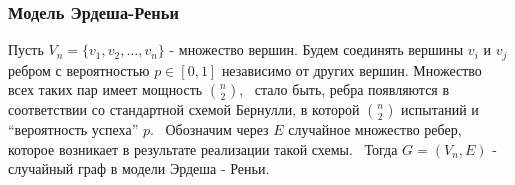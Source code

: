 \frametitle{Модель Эрдеша-Реньи} 


\begin{rdefinition}    
    Пусть $V_n = \{v_1, v_2, \dots, v_n\}$ - множество вершин. 
    Будем соединять вершины $v_i$ и $v_j$ ребром с вероятностью $p \in [0, 1]$ независимо от других вершин.  
    Множество всех таких пар имеет мощность $\binom{n}{2}$, \
    стало быть, ребра появляются в соответствии со стандартной схемой Бернулли, в которой  $\binom{n}{2}$ испытаний и “вероятность успеха” $p$. \
    Обозначим через $E$ случайное множество ребер, которое возникает в результате реализации такой схемы. \
    Тогда $G = (V_n, E)$ - случайный граф в модели Эрдеша - Реньи.
\end{rdefinition}
